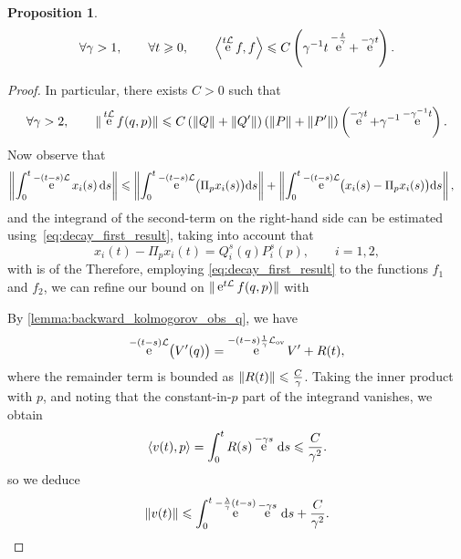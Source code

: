 \documentclass[11pt,a4paper]{article}
\DeclareMathOperator{\e}{e}
\renewcommand{\d}{\mathrm d}
\theoremstyle{plain}
\newtheorem{proposition}{Proposition}[section]
\numberwithin{equation}{section}
\renewcommand{\leq}{\leqslant}
\renewcommand{\geq}{\geqslant}
\begin{document}
\begin{proposition}
    \[
        \forall \gamma > 1, \qquad
        \forall t \geq 0, \qquad
        \ip{\e^{t \mathcal L}f}{f} \leq C \left( \gamma^{-1} t \e^{- \frac{t}{\gamma}} + \e^{-\gamma t} \right).
    \]
\end{proposition}
\begin{proof}
In particular, there exists $C > 0$ such that
\begin{equation}
    \label{eq:decay_first_result}
    \forall \gamma > 2, \qquad
    \norm*{ \e^{t \mathcal L} f(q,p) }
    \leq C \left( \norm*{Q} +  \norm*{Q'}\right) \left( \norm*{P} + \norm*{P'} \right)
    \left(\e^{-\gamma t} + \gamma^{-1} \e^{-\gamma^{-1} t}\right).
\end{equation}
Now observe that
\begin{align*}
    \norm{ \int_{0}^{t} \e^{- (t-s) \mathcal L}  x_i(s) \, \d s }
    &\leq \norm{ \int_{0}^{t} \e^{- (t-s) \mathcal L}  \bigl( \Pi_p x_i(s) \bigr) \d s }
    + \norm{ \int_{0}^{t} \e^{- (t-s) \mathcal L}  \bigl(x_i(s) - \Pi_p x_i(s)\bigr)  \d s},
\end{align*}
and the integrand of the second-term on the right-hand side can be estimated using~\eqref{eq:decay_first_result},
taking into account that
\[
    x_i(t) - \Pi_p x_i(t) = Q^s_i(q) P^s_i(p), \qquad i = 1, 2,
\]
with
is of the
Therefore, employing \eqref{eq:decay_first_result} to the functions $f_1$ and $f_2$,
we can refine our bound on $\norm*{ \e^{t \mathcal L} f(q,p) }$
with

By \cref{lemma:backward_kolmogorov_obs_q},
we have
\[
    \e^{- (t-s) \mathcal L} \bigl(V'(q)\bigr)
    = \e^{- (t-s) \frac{1}{\gamma}\mathcal L_{\rm ov}} V' + R(t),
\]
where the remainder term is bounded as $\norm{R(t)} \leq \frac{C}{\gamma}$.
Taking the inner product with $p$,
and noting that the constant-in-$p$ part of the integrand vanishes,
we obtain
\[
    \ip{v(t)}{p} = \int_{0}^{t} R(s) \e^{-\gamma s} \, \d s
    \leq \frac{C}{\gamma^2}.
\]
so we deduce
\[
    \norm{v(t)} \leq \int_{0}^{t} \e^{- \frac{\lambda}{\gamma}(t-s)} \e^{- \gamma s} \, \d s + \frac{C}{\gamma^2}.
\]
\end{proof}
\end{document}
